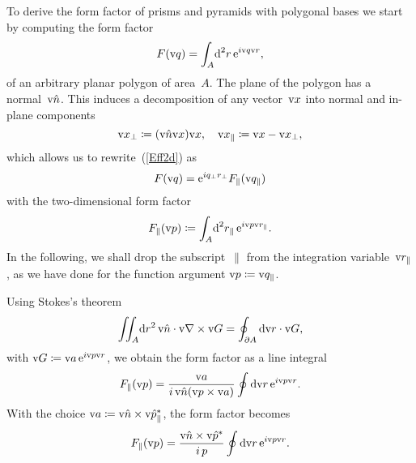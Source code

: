 To derive the form factor of prisms and pyramids with polygonal bases
we start by computing the form factor
\begin{equation}\label{Eff2d}
  F(\text{v}{q})=\int_A\!\text{d}^2r\, \text{e}^{i\text{v}{q}\text{v}{r}},
\end{equation}
of an arbitrary planar polygon of area~$A$.
The plane of the polygon has a normal~$\text{v}{\hat n}$.
This induces a decomposition of any vector~$\text{v}{x}$ into normal
and in-plane components
\begin{equation}
  \text{v}{x}_\perp\coloneqq (\text{v}{\hat n}\text{v}{x})\text{v}{x},\quad
  \text{v}{x}_\parallel\coloneqq\text{v}{x}-\text{v}{x}_\perp,
\end{equation}
which allows us to rewrite~(\ref{Eff2d}) as
\begin{equation}
  F(\text{v}{q})=\text{e}^{iq_\perp r_\perp}F_\parallel(\text{v}{q}_\parallel)
\end{equation}
with the two-dimensional form factor
\begin{equation}
  F_\parallel(\text{v}{p})
  \coloneqq \int_A\!\text{d}^2r_\parallel\, \text{e}^{i\text{v}{p}\text{v}{r}_\parallel}.
\end{equation}
In the following, we shall drop the subscript~$\parallel$
from the integration variable~$\text{v}{r}_\parallel$,
as we have done for the function argument $\text{v}{p}\coloneqq\text{v}{q}_\parallel$.

Using Stokes's theorem
\begin{equation}
  \iint_A\!\text{d} r^2\,\text{v}{\hat n}\cdot\text{v}{\nabla}\times\text{v}{G} = \oint_{\partial A} \text{d}\text{v}{r}\cdot\text{v}{G},
\end{equation}
with $\text{v}{G}\coloneqq\text{v}{a}\, \text{e}^{i\text{v}{p}\text{v}{r}}$,
we obtain the form factor as a line integral
\begin{equation}
  F_\parallel(\text{v}{p})=\frac{\text{v}{a}}{i\, \text{v}{\hat n}(\text{v}{p}\times\text{v}{a})} \oint \text{d}\text{v}{r}\,\text{e}^{i\text{v}{p}\text{v}{r}}.
\end{equation}
With the choice $\text{v}{a}\coloneqq\text{v}{\hat n}\times\text{v}{\hat p}_\parallel^*$,
the form factor becomes
\begin{equation}
  F_\parallel(\text{v}{p})=\frac{\text{v}{\hat n}\times\text{v}{\hat p}^*}{i\,p} \oint \text{d}\text{v}{r}\,\text{e}^{i\text{v}{p}\text{v}{r}}.
\end{equation}


